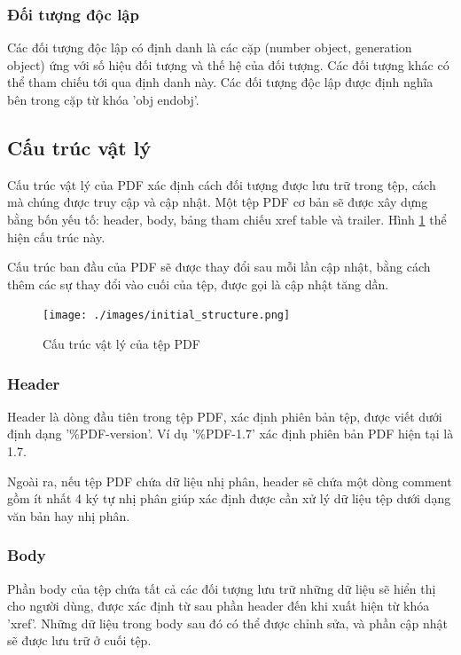 \documentclass[./../main.tex]{subfiles}
\begin{document}
\subsubsection*{Đối tượng độc lập}

Các đối tượng độc lập có định danh là các cặp (number object, generation object) ứng với số hiệu đối tượng và thế hệ của đối tượng. Các đối tượng khác có thể tham chiếu tới qua định danh này. Các đối tượng độc lập được định nghĩa bên trong cặp từ khóa 'obj endobj'.




\subsection{Cấu trúc vật lý}
Cấu trúc vật lý của PDF xác định cách đối tượng được lưu trữ trong tệp, cách mà chúng được truy cập và cập nhật. Một tệp PDF cơ bản sẽ được xây dựng bằng bốn yếu tố: header, body, bảng tham chiếu xref table và trailer. Hình \ref{fig:initstruct} thể hiện cấu trúc này.

Cấu trúc ban đầu của PDF sẽ được thay đổi sau mỗi lần cập nhật, bằng cách thêm các sự thay đổi vào cuối của tệp, được gọi là cập nhật tăng dần.
\begin{figure}[ht!]
	\centering
	\texttt{[image: ./images/initial\_structure.png]}
	\caption{Cấu trúc vật lý của tệp PDF}
	\label{fig:initstruct}
\end{figure}

\subsubsection*{Header}
Header là dòng đầu tiên trong tệp PDF, xác định phiên bản tệp, được viết dưới định dạng '\%PDF-version'. Ví dụ '\%PDF-1.7' xác định phiên bản PDF hiện tại là 1.7.

Ngoài ra, nếu tệp PDF chứa dữ liệu nhị phân, header sẽ chứa một dòng comment gồm ít nhất 4 ký tự nhị phân giúp xác định được cần xử lý dữ liệu tệp dưới dạng văn bản hay nhị phân.

\subsubsection*{Body}
Phần body của tệp chứa tất cả các đối tượng lưu trữ những dữ liệu sẽ hiển thị cho người dùng, được xác định từ sau phần header đến khi xuất hiện từ khóa 'xref'. Những dữ liệu trong body sau đó có thể được chỉnh sửa, và phần cập nhật sẽ được lưu trữ ở cuối tệp.
\end{document}
